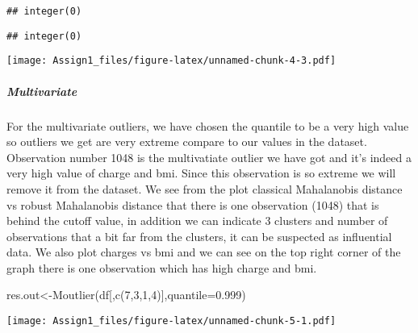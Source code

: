 \documentclass[
]{article}
\newenvironment{Shaded}{\begin{snugshade}}{\end{snugshade}}
\newcommand{\AttributeTok}[1]{\textcolor[rgb]{0.77,0.63,0.00}{#1}}
\newcommand{\CommentTok}[1]{\textcolor[rgb]{0.56,0.35,0.01}{\textit{#1}}}
\newcommand{\DecValTok}[1]{\textcolor[rgb]{0.00,0.00,0.81}{#1}}
\newcommand{\FloatTok}[1]{\textcolor[rgb]{0.00,0.00,0.81}{#1}}
\newcommand{\FunctionTok}[1]{\textcolor[rgb]{0.00,0.00,0.00}{#1}}
\newcommand{\NormalTok}[1]{#1}
\newcommand{\OtherTok}[1]{\textcolor[rgb]{0.56,0.35,0.01}{#1}}
\newcommand{\SpecialCharTok}[1]{\textcolor[rgb]{0.00,0.00,0.00}{#1}}
\begin{document}
\begin{verbatim}
## integer(0)
\end{verbatim}

\begin{Shaded}
\end{Shaded}

\begin{verbatim}
## integer(0)
\end{verbatim}

\texttt{[image: Assign1\_files/figure-latex/unnamed-chunk-4-3.pdf]}

\hypertarget{multivariate}{%
\subparagraph{Multivariate}\label{multivariate}}

For the multivariate outliers, we have chosen the quantile to be a very
high value so outliers we get are very extreme compare to our values in
the dataset. Observation number 1048 is the multivatiate outlier we have
got and it's indeed a very high value of charge and bmi. Since this
observation is so extreme we will remove it from the dataset. We see
from the plot classical Mahalanobis distance vs robust Mahalanobis
distance that there is one observation (1048) that is behind the cutoff
value, in addition we can indicate 3 clusters and number of observations
that a bit far from the clusters, it can be suspected as influential
data. We also plot charges vs bmi and we can see on the top right corner
of the graph there is one observation which has high charge and bmi.

\begin{Shaded}
\begin{Highlighting}[]
\NormalTok{res.out}\OtherTok{\textless{}{-}}\FunctionTok{Moutlier}\NormalTok{(df[,}\FunctionTok{c}\NormalTok{(}\DecValTok{7}\NormalTok{,}\DecValTok{3}\NormalTok{,}\DecValTok{1}\NormalTok{,}\DecValTok{4}\NormalTok{)],}\AttributeTok{quantile=}\FloatTok{0.999}\NormalTok{)}
\end{Highlighting}
\end{Shaded}

\texttt{[image: Assign1\_files/figure-latex/unnamed-chunk-5-1.pdf]}

\begin{Shaded}
\end{Shaded}
\end{document}
